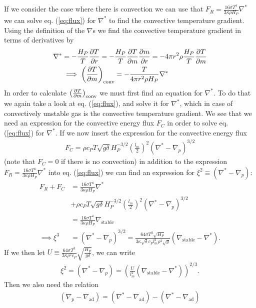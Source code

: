 \documentclass{emulateapj}
\begin{document}
	If we consider the case where there is convection we can use that $F_R = \frac{16\sigma T^4}{3\kappa\rho H_P}\nabla^*$ we can solve eq. (\ref{eq:flux}) for $\nabla^*$ to find the convective temperature gradient. Using the definition of the $\nabla$s we find the convective temperature gradient in terms of derivatives by 
	\begin{align}
		\nabla^* &= -\frac{H_P}{T}\pdv{T}{r} = -\frac{H_P}{T}\pdv{T}{m}\pdv{m}{r} = -4\pi r^2\rho\frac{H_P}{T}\pdv{T}{m}\\
		&\implies \left(\pdv{T}{m}\right)_\text{conv} =- \frac{T}{4\pi r^2 \rho H_P}\nabla^*
	\end{align}
	In order to calculate $\left(\pdv{T}{m}\right)_\text{conv}$ we must first find an equation for $\nabla^*$.
	To do that we again take a look at eq. (\ref{eq:flux}), and solve it for $\nabla^*$, which in case of convectively unstable gas is the convective temperature gradient.
	We see that we need an expression for the convective energy flux $F_C$ in order to solve eq. (\ref{eq:flux}) for $\nabla^*$. If we now insert the expression for the convective energy flux
	\begin{align}
		F_C = \rho c_P T\sqrt{g\delta} H_P^{-3/2}\left(\frac{l_m}{2}\right)^2(\nabla^* - \nabla_p)^{3/2}
	\end{align}
	(note that $F_C=0$ if there is no convection) in addition to the expression $F_R = \frac{16\sigma T^4}{3\kappa\rho H_P}\nabla^*$ into eq. (\ref{eq:flux}) we can find an expression for $\xi^2\equiv(\nabla^*-\nabla_p)$:
	\begin{align*}
		F_R + F_C &= \frac{16\sigma T^4}{3\kappa\rho H_P}\nabla^* \\
		&+ \rho c_P T\sqrt{g\delta} H_P^{-3/2}\left(\frac{l_m}{2}\right)^2(\nabla^* - \nabla_p)^{3/2} \\
		&= \frac{16\sigma T^4}{3\kappa\rho H_P}\nabla_\text{stable}\\
		\implies \xi^3&=\left(\nabla^* - \nabla_p\right)^{3/2} = \frac{64\sigma T^3\sqrt{H_P}}{3\kappa\sqrt{\delta}c_P l_m^2\rho^2\sqrt{g}}\left(\nabla_\text{stable}-\nabla^*\right).
	\end{align*}
	If we then let $U \equiv \frac{64\sigma T^3}{3\kappa\rho^2c_P}\sqrt{\frac{H_P}{g\delta}}$, we can write 
	\begin{align}
		\xi^2 = (\nabla^*-\nabla_p) = \left(\frac{U}{l_m^2}(\nabla_\text{stable} - \nabla^*)\right)^{2/3}.
		\label{eq:XiThirdDeg1}
	\end{align}
	Then we also need the relation
	\begin{align}
		(\nabla_p - \nabla_\text{ad}) = (\nabla^* - \nabla_\text{ad}) - (\nabla^* - \nabla_\text{ad})
		\label{eq:nablarelation}
	\end{align}
\end{document}
